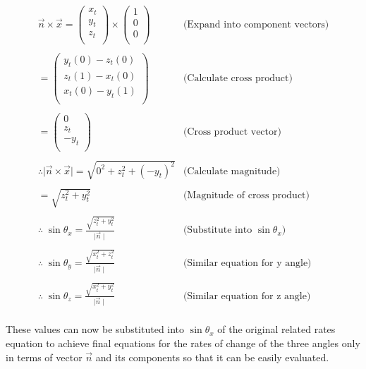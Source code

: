 \documentclass[12pt]{article}
\begin{document}
$$
\begin{array}{l|c}
 \vec n \times \vec x = \begin{pmatrix} x_t \\ y_t \\ z_t \\
\end{pmatrix} \times \begin{pmatrix} 1 \\ 0 \\ 0 \\
\end{pmatrix} & \text{(Expand into component vectors)}\\ \\
=\begin{pmatrix} y_t(0) - z_t(0) \\ z_t(1) - x_t(0) \\ x_t(0) - y_t(1) \\
\end{pmatrix} & \text{(Calculate cross product)}\\ \\
= \begin{pmatrix} 0 \\ z_t \\ -y_t \\ 
\end{pmatrix} & \text{(Cross product vector)} \\ \\
\therefore \mid \vec n \times \vec x \mid = \sqrt{0^2 + z_t^2 +(-y_t)^2} & \text{(Calculate magnitude)} \\ \\
= \sqrt{z_t^2 + y_t^2} & \text{(Magnitude of cross product)} \\ \\
\boxed{\therefore \; \sin \theta_x = \frac{\sqrt{z_t^2 + y_t^2}}{\mid \vec n \mid}} & \text{(Substitute into } \sin \theta_x \text{)} \\ \\
\boxed{\therefore \; \sin \theta_y = \frac{\sqrt{x_t^2 + z_t^2}}{\mid \vec n \mid}} & \text{(Similar equation for y angle)} \\ \\
\boxed{\therefore \; \sin \theta_z = \frac{\sqrt{x_t^2 + y_t^2}}{\mid \vec n \mid}} & \text{(Similar equation for z angle)} \\
\end{array} 
$$

\vspace{20pt}
These values can now be substituted into $\sin \theta_x$ of the original related rates equation to achieve final equations for the rates of change of the three angles only in terms of vector $\vec n$ and its components so that it can be easily evaluated.
\end{document}
